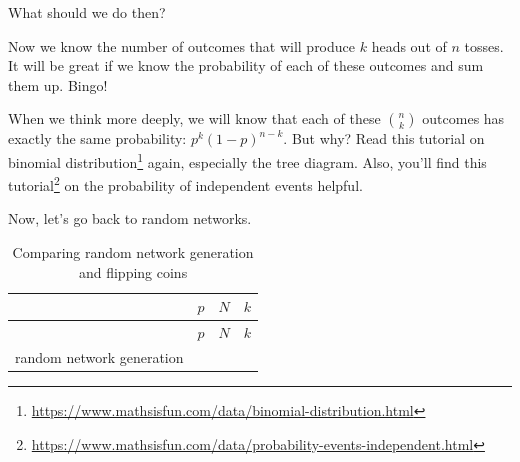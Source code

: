 \documentclass[
]{krantz}
\renewcommand{\href}[2]{#2\footnote{\url{#1}}}
\begin{document}
What should we do then?

Now we know the number of outcomes that will produce \(k\) heads out of \(n\) tosses. It will be great if we know the probability of each of these outcomes and sum them up. Bingo!

When we think more deeply, we will know that each of these \(n\choose k\) outcomes has exactly the same probability: \(p^k(1-p)^{n-k}\). But why? Read \href{https://www.mathsisfun.com/data/binomial-distribution.html}{this tutorial on binomial distribution} again, especially the tree diagram. Also, you'll find \href{https://www.mathsisfun.com/data/probability-events-independent.html}{this tutorial} on the probability of independent events helpful.

Now, let's go back to random networks.

\begin{longtable}[]{@{}llll@{}}
\caption{\label{tab:network-and-coin} Comparing random network generation and flipping coins}\tabularnewline
\toprule
\begin{minipage}[b]{0.20\columnwidth}\raggedright
\strut
\end{minipage} & \begin{minipage}[b]{0.32\columnwidth}\raggedright
\(p\)\strut
\end{minipage} & \begin{minipage}[b]{0.14\columnwidth}\raggedright
\(N\)\strut
\end{minipage} & \begin{minipage}[b]{0.23\columnwidth}\raggedright
\(k\)\strut
\end{minipage}\tabularnewline
\midrule
\endfirsthead
\toprule
\begin{minipage}[b]{0.20\columnwidth}\raggedright
\strut
\end{minipage} & \begin{minipage}[b]{0.32\columnwidth}\raggedright
\(p\)\strut
\end{minipage} & \begin{minipage}[b]{0.14\columnwidth}\raggedright
\(N\)\strut
\end{minipage} & \begin{minipage}[b]{0.23\columnwidth}\raggedright
\(k\)\strut
\end{minipage}\tabularnewline
\midrule
\endhead
\begin{minipage}[t]{0.20\columnwidth}\raggedright
random network generation\strut
\end{minipage} & \begin{minipage}[t]{0.32\columnwidth}\raggedright

\end{minipage}
\end{longtable}
\end{document}
